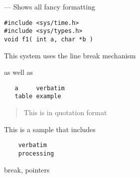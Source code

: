 \startmanpage
{}
--- Shows all fancy formatting 
\startvb\begin{verbatim}
#include <sys/time.h> 
#include <sys/types.h> 
void f1( int a, char *b )
\end{verbatim}
\endvb

\par
{}
\par
{}
This system uses the line
\nextline
break mechanism
\nextline
\par
as well as
\begin{verbatim}
   a     verbatim
   table example
\end{verbatim}

\par
\begin{quotation}
This is in quotation format
\end{quotation}
\par
\par
{}
This is a sample that includes
\begin{verbatim}
    verbatim 
    processing
\end{verbatim}

\par
{}
break, pointers
\nextline
{}
\endmanpage
